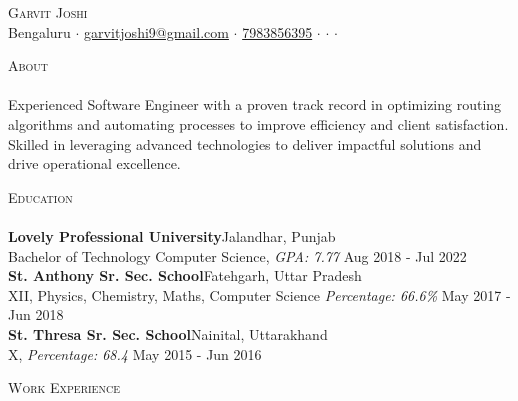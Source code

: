\documentclass[a4paper]{article}
\newcommand{\lineunder} {
    \vspace*{-8pt} \\
    \hspace*{-18pt} \hrulefill \\
}
\newcommand{\header} [1] {
    {\hspace*{-18pt}\vspace*{6pt} \textsc{#1}}
    \vspace*{-6pt} \lineunder
}
\begin{document}
\vspace*{-40pt}

    

\vspace*{-10pt}
\begin{center}
	{\Huge \scshape {Garvit Joshi}}\\
	Bengaluru $\cdot$ \href{mailto:garvitjoshi9@gmail.com}{garvitjoshi9@gmail.com} $\cdot$ \href{tel:7983856395}{7983856395} $\cdot$ \href{https://garvit-joshi.github.io}{\faBriefcase} $\cdot$ \href{https://www.linkedin.com/in/garvitjoshi9/}{\faLinkedin} $\cdot$ \href{https://github.com/garvit-joshi/}{\faGithub}\\
\end{center}

\header{About}
Experienced Software Engineer with a proven track record in optimizing routing algorithms and automating processes to improve efficiency and client satisfaction. Skilled in leveraging advanced technologies to deliver impactful solutions and drive operational excellence.

\header{Education}
\textbf{Lovely Professional University}\hfill Jalandhar, Punjab\\
Bachelor of Technology Computer Science, \textit{GPA: 7.77} \hfill Aug 2018 - Jul 2022\\
\vspace{2mm}
\textbf{St. Anthony Sr. Sec. School}\hfill Fatehgarh, Uttar Pradesh\\
XII, Physics, Chemistry, Maths, Computer Science \textit{Percentage: 66.6\%} \hfill May 2017 - Jun 2018\\
\vspace{2mm}
\textbf{St. Thresa Sr. Sec. School}\hfill Nainital, Uttarakhand\\
X, \textit{Percentage: 68.4} \hfill May 2015 - Jun 2016\\
\vspace{2mm}

\header{Work Experience}
\vspace{1mm}
\end{document}
